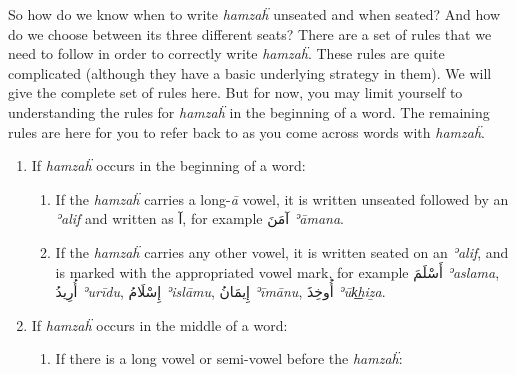 \documentclass[
  10pt,
]{book}
\providecommand{\tightlist}{%
  \setlength{\itemsep}{0pt}\setlength{\parskip}{0pt}}
\begin{document}
So how do we know when to write \emph{hamzaḧ} unseated and when seated? And how do we choose between its three different seats? There are a set of rules that we need to follow in order to correctly write \emph{hamzaḧ}. These rules are quite complicated (although they have a basic underlying strategy in them). We will give the complete set of rules here. But for now, you may limit yourself to understanding the rules for \emph{hamzaḧ} in the beginning of a word. The remaining rules are here for you to refer back to as you come across words with \emph{hamzaḧ}.

\begin{enumerate}
\def\labelenumi{\arabic{enumi}.}
\tightlist
\item
  If \emph{hamzaḧ} occurs in the beginning of a word:

  \begin{enumerate}
  \def\labelenumii{\alph{enumii}.}
  \tightlist
  \item
    If the \emph{hamzaḧ} carries a long-\emph{ā} vowel, it is written unseated followed by an \emph{ʾalif} and written as \foreignlanguage{arabic}{آ}, for example \foreignlanguage{arabic}{آمَنَ} \emph{ʾāmana}.
  \item
    If the \emph{hamzaḧ} carries any other vowel, it is written seated on an \emph{ʾalif}, and is marked with the appropriated vowel mark, for example \foreignlanguage{arabic}{أَسْلَمَ} \emph{ʾaslama}, \foreignlanguage{arabic}{أُرِيدُ} \emph{ʾurīdu}, \foreignlanguage{arabic}{إِسْلَامُ} \emph{ʾislāmu}, \foreignlanguage{arabic}{إِيمَانُ} \emph{ʾīmānu}, \foreignlanguage{arabic}{أُوخِذَ} \emph{ʾūk͟hiẕa}.
  \end{enumerate}
\item
  If \emph{hamzaḧ} occurs in the middle of a word:

  \begin{enumerate}
  \def\labelenumii{\alph{enumii}.}
  \tightlist
  \item
    If there is a long vowel or semi-vowel before the \emph{hamzaḧ}:


\end{enumerate}
\end{enumerate}
\end{document}
